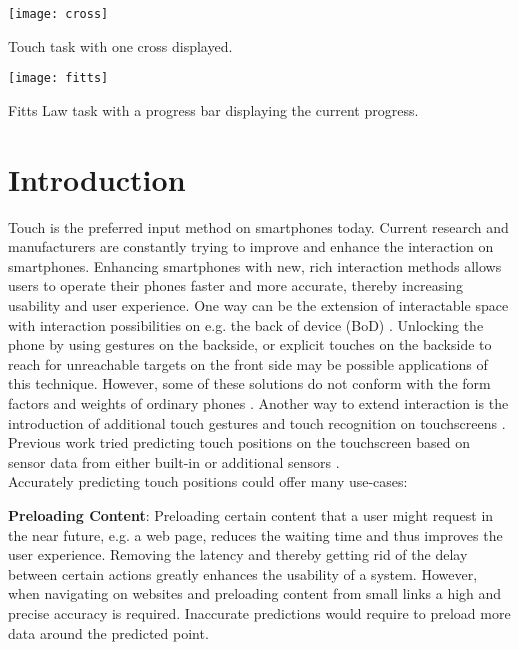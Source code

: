 \begin{marginfigure}
	\vspace{-2.5cm}
	\texttt{[image: cross]}
	\caption{Touch task with one cross displayed.\newline}
	\label{fig:touchtask}
\end{marginfigure}

\begin{marginfigure}
	\texttt{[image: fitts]}
	\caption{Fitts Law task with a progress bar displaying the current progress.}
	\label{fig:fittstask}
\end{marginfigure}

\section{Introduction}
\label{sec:intro}
Touch is the preferred input method on smartphones today. 
Current research and manufacturers are constantly trying to improve and enhance the interaction on smartphones. 
Enhancing smartphones with new, rich interaction methods allows users to operate their phones faster and more accurate, thereby increasing usability and user experience.
One way can be the extension of interactable space with interaction possibilities on e.g. the back of device (BoD) \cite{Le2016,Baudisch2009,Le2017}.
Unlocking the phone by using gestures on the backside, or explicit touches on the backside to reach for unreachable targets on the front side may be possible applications of this technique.
However, some of these solutions do not conform with the form factors and weights of ordinary phones \cite{Corsten2017,DeLuca2013,Wolf2012}.
Another way to extend interaction is the introduction of additional touch gestures and touch recognition on touchscreens \cite{Le:2018:PalmTouch, Holz2015,Guo2015}.
Previous work tried predicting touch positions on the touchscreen based on sensor data from either built-in or additional sensors \cite{Le2017:Predic,MohdNoor2016}.\\
Accurately predicting touch positions could offer many use-cases:

\textbf{Preloading Content}: Preloading certain content that a user might request in the near future, e.g. a web page, reduces the waiting time and thus improves the user experience. 
Removing the latency and thereby getting rid of the delay between certain actions greatly enhances the usability of a system. 
However, when navigating on websites and preloading content from small links a high and precise accuracy is required. 
Inaccurate predictions would require to preload more data around the predicted point.

